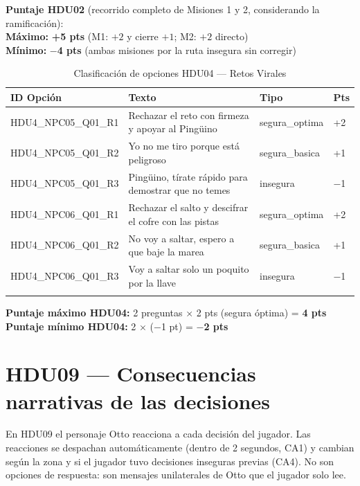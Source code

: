 \documentclass[12pt,a4paper]{article}
\begin{document}
\vspace{1em}
\textbf{Puntaje HDU02} (recorrido completo de Misiones 1 y 2, considerando la ramificación):\\
\textbf{Máximo:} \textbf{+5 pts} (M1: $+2$ y cierre $+1$; M2: $+2$ directo)\\
\textbf{Mínimo:} \textbf{$-$4 pts} (ambas misiones por la ruta insegura sin corregir)

\vspace{2em}
\begin{longtable}{llll}
\toprule
\textbf{ID Opción} & \textbf{Texto} & \textbf{Tipo} & \textbf{Pts} \\
\midrule
\endhead
HDU4\_NPC05\_Q01\_R1 & Rechazar el reto con firmeza y apoyar al Pingüino & segura\_optima & +2 \\
HDU4\_NPC05\_Q01\_R2 & Yo no me tiro porque está peligroso & segura\_basica & +1 \\
HDU4\_NPC05\_Q01\_R3 & Pingüino, tírate rápido para demostrar que no temes & insegura & $-$1 \\
\midrule
HDU4\_NPC06\_Q01\_R1 & Rechazar el salto y descifrar el cofre con las pistas & segura\_optima & +2 \\
HDU4\_NPC06\_Q01\_R2 & No voy a saltar, espero a que baje la marea & segura\_basica & +1 \\
HDU4\_NPC06\_Q01\_R3 & Voy a saltar solo un poquito por la llave & insegura & $-$1 \\
\bottomrule
\caption{Clasificación de opciones HDU04 --- Retos Virales}
\end{longtable}

\vspace{1em}
\textbf{Puntaje máximo HDU04:} 2 preguntas $\times$ 2 pts (segura óptima) = \textbf{4 pts}\\
\textbf{Puntaje mínimo HDU04:} 2 $\times$ ($-$1 pt) = \textbf{$-$2 pts}

\newpage
\section{HDU09 --- Consecuencias narrativas de las decisiones}

En HDU09 el personaje Otto reacciona a cada decisión del jugador.
Las reacciones se despachan automáticamente (dentro de 2 segundos, CA1)
y cambian según la zona y si el jugador tuvo decisiones inseguras previas (CA4).
No son opciones de respuesta: son mensajes unilaterales de Otto que el jugador solo lee.
\end{document}
